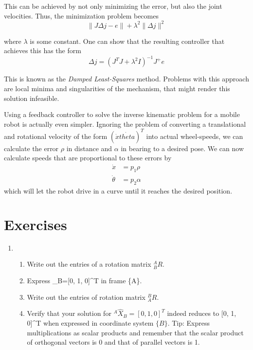 This can be achieved by not only minimizing the error, but also the joint velocities. Thus, the minimization problem becomes
\begin{equation}
\|J\Delta j-e\|+\lambda^2\|\Delta j\|^2
\end{equation}

where $\lambda$ is some constant. One can show that the resulting controller that achieves this has the form
\begin{equation}
\Delta j=(J^TJ+\lambda^2 I)^{-1}J^+e
\end{equation}

This is known as the \emph{Damped Least-Squares} method. Problems with this approach are local minima and singularities of the mechanism, that might render this solution infeasible.

Using a feedback controller to solve the inverse kinematic problem for a mobile robot is actually even simpler. Ignoring the problem of converting a translational and rotational velocity of the form $(\dot{x} \dot{theta})^T$ into actual wheel-speeds, we can calculate the error $\rho$ in distance and $\alpha$ in bearing to a desired pose. We can now calculate speeds that are proportional to these errors by
\begin{eqnarray}
\dot{x} &= p_1 \rho\\
\dot{\theta} &= p_2 \alpha
\end{eqnarray}
which will let the robot drive in a curve until it reaches the desired position. 

\section*{Exercises}
\begin{enumerate}
\item 
\begin{enumerate}
 \item Write out the entries of a rotation matrix $^A_BR$. 
 \item Express _B=[0, 1, 0]^T in frame \{A\}.
 \item Write out the entries of rotation matrix $^B_AR$.
 \item Verify that your solution for $^A\hat{X}_B=[0, 1, 0]^T$ indeed reduces to [0, 1, 0]^T when expressed in coordinate system $\{B\}$. Tip: Express multiplications as scalar products and remember that the scalar product of orthogonal vectors is 0 and that of parallel vectors is 1.
\end{enumerate} 

\end{enumerate}




